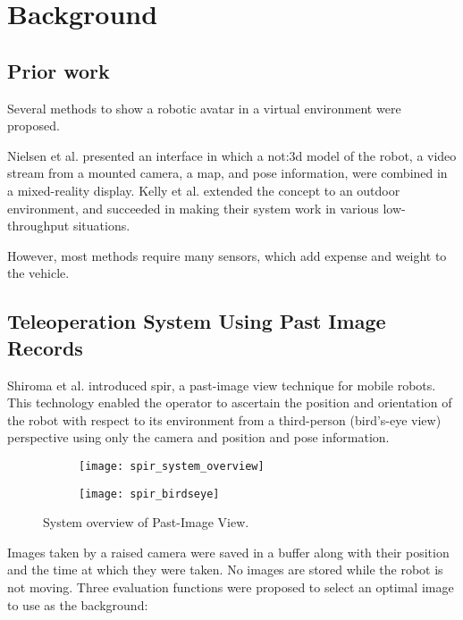 \chapter{Background}
\label{ch:background}

\section{Prior work}
Several methods to show a robotic avatar in a virtual environment were proposed.

Nielsen et al. presented an interface in which a \gls{not:3d} model of the robot, a video stream from a mounted camera, a map, and pose information, were combined in a mixed-reality display.\cite{nielsen2007}
Kelly et al. extended the concept to an outdoor environment, and succeeded in making their system work in various low-throughput situations.\cite{kelly2011}

However, most methods require many sensors, which add expense and weight to the vehicle.

\section{Teleoperation System Using Past Image Records}
Shiroma et al. introduced \gls{spir}, a past-image view technique for mobile robots.\cite{shiroma2004}
This technology enabled the operator to ascertain the position and orientation of the robot with respect to its environment from a third-person (bird's-eye view) perspective using only the camera and position and pose information.

\begin{figure}[h]
  \centering
  \begin{subfigure}[b]{0.45\textwidth}
    \texttt{[image: spir\_system\_overview]}
  \end{subfigure}
  \hfill
  \begin{subfigure}[b]{0.45\textwidth}
    \texttt{[image: spir\_birdseye]}
  \end{subfigure}
  \caption{System overview of Past-Image View.\cite{shiroma2004}}
  \label{fig:spir_system_overview}
\end{figure}

Images taken by a raised camera were saved in a buffer along with their position and the time at which they were taken.
No images are stored while the robot is not moving.
Three evaluation functions were proposed to select an optimal image to use as the background:

